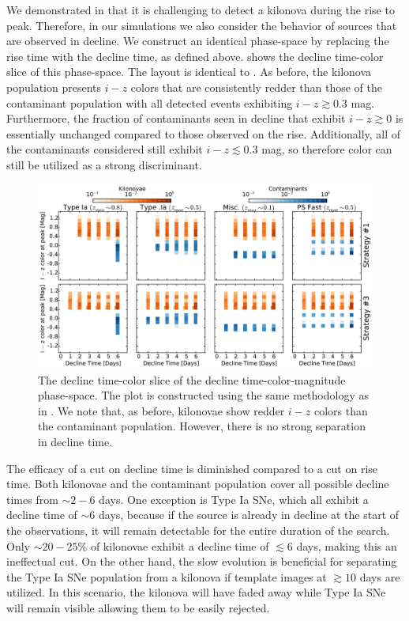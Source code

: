 We demonstrated in  that it is challenging to detect a kilonova during the rise to peak. Therefore, in our simulations we also consider the behavior of sources that are observed in decline. We construct an identical phase-space by replacing the rise time with the decline time, as defined above.  shows the decline time-color slice of this phase-space. The layout is identical to . As before, the kilonova population presents $i-z$ colors that are consistently redder than those of the contaminant population with all detected events exhibiting $i-z \gtrsim 0.3$ mag. Furthermore, the fraction of contaminants seen in decline that exhibit $i-z\gtrsim0$ is essentially unchanged compared to those observed on the rise. Additionally, all of the contaminants considered still exhibit $i-z \lesssim 0.3$ mag, so therefore color can still be utilized as a strong discriminant. 

\begin{figure}[t!]
\centering
\includegraphics[width=\textwidth]{./figs/chapter2/f10.pdf}
\caption{\singlespace The decline time-color slice of the decline time-color-magnitude phase-space. The plot is constructed using the same methodology as in . We note that, as before, kilonovae show redder $i-z$ colors than the contaminant population. However, there is no strong separation in decline time.}
\label{fig:ch2_deccol}
\end{figure}

The efficacy of a cut on decline time is diminished compared to a cut on rise time. Both kilonovae and the contaminant population cover all possible decline times from $\sim2-6$ days. One exception is Type Ia SNe, which all exhibit a decline time of $\sim6$ days, because if the source is already in decline at the start of the observations, it will remain detectable for the entire duration of the search. Only $\sim20-25\%$ of kilonovae exhibit a decline time of $\lesssim6$ days, making this an ineffectual cut. On the other hand, the slow evolution is beneficial for separating the Type Ia SNe population from a kilonova if template images at $\gtrsim 10$ days are utilized. In this scenario, the kilonova will have faded away while Type Ia SNe will remain visible allowing them to be easily rejected. 

